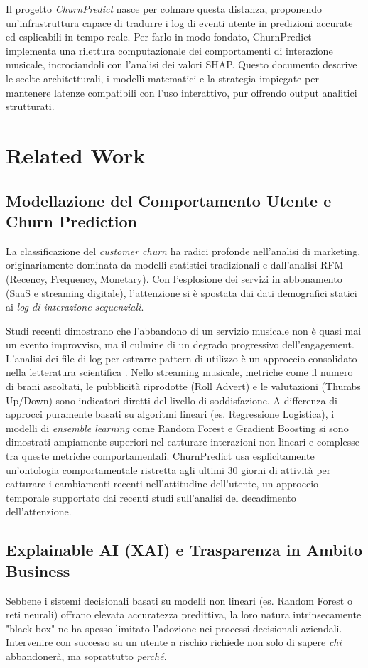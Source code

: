 \documentclass[11pt,a4paper]{article}
\begin{document}
Il progetto \textit{ChurnPredict} nasce per colmare questa distanza, proponendo un'infrastruttura capace di tradurre i log di eventi utente in predizioni accurate ed esplicabili in tempo reale. Per farlo in modo fondato, ChurnPredict implementa una rilettura computazionale dei comportamenti di interazione musicale, incrociandoli con l'analisi dei valori SHAP. Questo documento descrive le scelte architetturali, i modelli matematici e la strategia impiegate per mantenere latenze compatibili con l'uso interattivo, pur offrendo output analitici strutturati.

\section{Related Work}
\subsection{Modellazione del Comportamento Utente e Churn Prediction}
La classificazione del \textit{customer churn} ha radici profonde nell'analisi di marketing, originariamente dominata da modelli statistici tradizionali e dall'analisi RFM (Recency, Frequency, Monetary). Con l'esplosione dei servizi in abbonamento (SaaS e streaming digitale), l'attenzione si è spostata dai dati demografici statici ai \textit{log di interazione sequenziali}.

Studi recenti dimostrano che l'abbandono di un servizio musicale non è quasi mai un evento improvviso, ma il culmine di un degrado progressivo dell'engagement. L'analisi dei file di log per estrarre pattern di utilizzo è un approccio consolidato nella letteratura scientifica \cite{burez2009}. Nello streaming musicale, metriche come il numero di brani ascoltati, le pubblicità riprodotte (Roll Advert) e le valutazioni (Thumbs Up/Down) sono indicatori diretti del livello di soddisfazione. 
A differenza di approcci puramente basati su algoritmi lineari (es. Regressione Logistica), i modelli di \textit{ensemble learning} come Random Forest e Gradient Boosting si sono dimostrati ampiamente superiori nel catturare interazioni non lineari e complesse tra queste metriche comportamentali. ChurnPredict usa esplicitamente un'ontologia comportamentale ristretta agli ultimi 30 giorni di attività per catturare i cambiamenti recenti nell'attitudine dell'utente, un approccio temporale supportato dai recenti studi sull'analisi del decadimento dell'attenzione.

\subsection{Explainable AI (XAI) e Trasparenza in Ambito Business}
Sebbene i sistemi decisionali basati su modelli non lineari (es. Random Forest o reti neurali) offrano elevata accuratezza predittiva, la loro natura intrinsecamente "black-box" ne ha spesso limitato l'adozione nei processi decisionali aziendali. Intervenire con successo su un utente a rischio richiede non solo di sapere \textit{chi} abbandonerà, ma soprattutto \textit{perché}.
\end{document}

